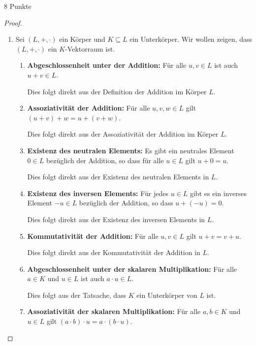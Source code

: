 \documentclass{problemset}
\begin{document}
\begin{problem}{8 Punkte}
\begin{proof}
    \begin{enumerate}
        \item Sei $(L, +, \cdot)$ ein Körper und $K \subseteq L$ ein Unterkörper. Wir wollen
              zeigen, dass $(L, +, \cdot)$ ein $K$-Vektorraum ist.

              \begin{enumerate}
                  \item \textbf{Abgeschlossenheit unter der Addition:} Für alle $u, v \in L$ ist auch $u + v \in L$.

                        Dies folgt direkt aus der Definition der Addition im Körper $L$.

                  \item \textbf{Assoziativität der Addition:} Für alle $u, v, w \in L$ gilt $(u + v) + w = u + (v + w)$.

                        Dies folgt direkt aus der Assoziativität der Addition im Körper $L$.

                  \item \textbf{Existenz des neutralen Elements:} Es gibt ein neutrales Element $0 \in L$ bezüglich der Addition, so dass für alle $u \in L$ gilt $u + 0 = u$.

                        Dies folgt direkt aus der Existenz des neutralen Elements in $L$.

                  \item \textbf{Existenz des inversen Elements:} Für jedes $u \in L$ gibt es ein inverses Element $-u \in L$ bezüglich der Addition, so dass $u + (-u) = 0$.

                        Dies folgt direkt aus der Existenz des inversen Elements in $L$.

                  \item \textbf{Kommutativität der Addition:} Für alle $u, v \in L$ gilt $u + v = v + u$.

                        Dies folgt direkt aus der Kommutativität der Addition in $L$.

                  \item \textbf{Abgeschlossenheit unter der skalaren Multiplikation:} Für alle $a \in K$ und $u \in L$ ist auch $a \cdot u \in L$.

                        Dies folgt aus der Tatsache, dass $K$ ein Unterkörper von $L$ ist.

                  \item \textbf{Assoziativität der skalaren Multiplikation:} Für alle $a, b \in K$ und $u \in L$ gilt $(a \cdot b) \cdot u = a \cdot (b \cdot u)$.


\end{enumerate}
\end{enumerate}
\end{proof}
\end{problem}
\end{document}
